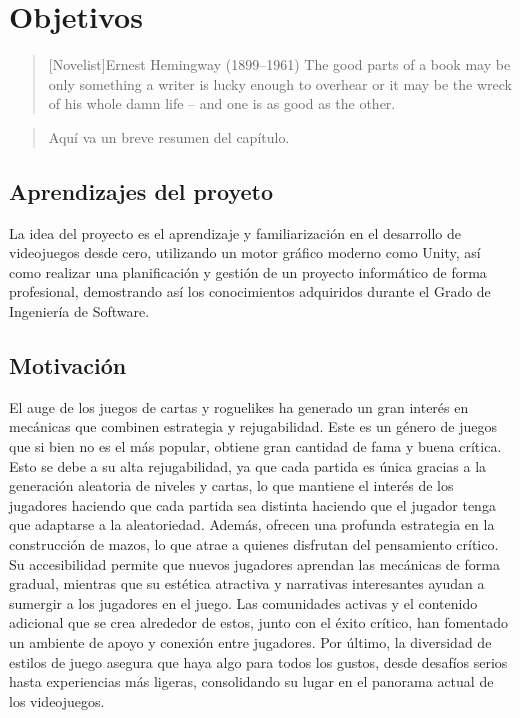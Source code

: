 \chapter{Objetivos}

\begin{quotation}[Novelist]{Ernest Hemingway (1899--1961)}
The good parts of a book may be only something a writer is lucky enough to overhear or it may be the wreck of his whole damn life -- and one is as good as the other.
\end{quotation}

\begin{abstract}
Aquí va un breve resumen del capítulo.
\end{abstract}

\section{Aprendizajes del proyeto}
La idea del proyecto es el aprendizaje y familiarización en el desarrollo de videojuegos desde cero, utilizando un motor gráfico moderno como Unity, así como realizar una planificación y gestión de un proyecto informático de forma profesional, demostrando así los conocimientos adquiridos durante el Grado de Ingeniería de Software.

\section{Motivación}
El auge de los juegos de cartas y roguelikes ha generado un gran interés en mecánicas que combinen estrategia y rejugabilidad. Este es un género de juegos que si bien no es el más popular, obtiene gran cantidad de fama y buena crítica. Esto se debe a su alta rejugabilidad, ya que cada partida es única gracias a la generación aleatoria de niveles y cartas, lo que mantiene el interés de los jugadores haciendo que cada partida sea distinta haciendo que el jugador tenga que adaptarse a la aleatoriedad. Además, ofrecen una profunda estrategia en la construcción de mazos, lo que atrae a quienes disfrutan del pensamiento crítico. Su accesibilidad permite que nuevos jugadores aprendan las mecánicas de forma gradual, mientras que su estética atractiva y narrativas interesantes ayudan a sumergir a los jugadores en el juego. Las comunidades activas y el contenido adicional que se crea alrededor de estos, junto con el éxito crítico, han fomentado un ambiente de apoyo y conexión entre jugadores. Por último, la diversidad de estilos de juego asegura que haya algo para todos los gustos, desde desafíos serios hasta experiencias más ligeras, consolidando su lugar en el panorama actual de los videojuegos.

